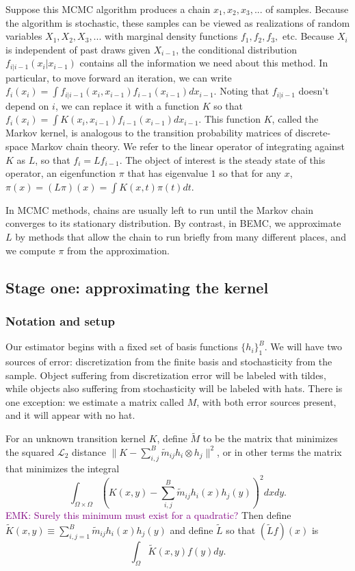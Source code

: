 \documentclass{article}
\newcommand\EMK[1]{\textcolor{purple}{EMK: #1}}
\begin{document}
Suppose this MCMC algorithm produces a chain $ x_1, x_2, x_3, ...$ of samples. Because the algorithm is stochastic, these samples can be viewed as realizations of random variables $X_1, X_2, X_3, ...$ with marginal density functions $f_1, f_2, f_3, $ etc. Because $X_i$ is independent of past draws given $X_{i-1}$, the conditional distribution $f_{i|i-1}(x_i|x_{i-1})$ contains all the information we need about this method. In particular, to move forward an iteration, we can write $f_i(x_i) = \int f_{i|i-1}(x_{i},x_{i-1})f_{i-1}(x_{i-1})dx_{i-1}$. Noting that $f_{i|i-1}$ doesn't depend on $i$, we can replace it with a function $K$ so that $f_i(x_i) = \int K(x_i, x_{i-1})f_{i-1}(x_{i-1})dx_{i-1}$. This function $K$, called the Markov kernel, is analogous to the transition probability matrices of discrete-space Markov chain theory. We refer to the linear operator of integrating against $K$ as $L$, so that $f_{i} = Lf_{i-1}$. The object of interest is the steady state of this operator, an eigenfunction $\pi$ that has eigenvalue $1$ so that for any $x$, $\pi(x) = (L\pi)(x) = \int K(x, t)\pi(t)dt$. 

In MCMC methods, chains are usually left to run until the Markov chain converges to its stationary distribution. By contrast, in BEMC, we approximate $L$ by methods that allow the chain to run briefly from many different places, and we compute $\pi$ from the approximation. 

\subsection{Stage one: approximating the kernel}
\label{sec:BEMC}

\subsubsection{Notation and setup}

Our estimator begins with a fixed set of basis functions $\{h_i\}_1^B$. We will have two sources of error: discretization from the finite basis and stochasticity from the sample. Object suffering from discretization error will be labeled with tildes, while objects also suffering from stochasticity will be labeled with hats. There is one exception: we estimate a matrix called $M$, with both error sources present, and it will appear with no hat.

For an unknown transition kernel $K$, define $\tilde{M}$ to be the matrix that minimizes the squared $\mathcal{L}_2$ distance $\|K - \sum_{i,j}^B\tilde{m}_{ij} h_i \otimes h_j\|^2$, or in other terms the matrix that minimizes the integral $$\int_{\Omega\times\Omega}(K(x,y) - \sum_{i,j}^B\tilde{m}_{ij} h_i(x)h_j(y))^2dx dy .$$ \EMK{Surely this minimum must exist for a quadratic?} Then define $\tilde{K}(x,y) \equiv \sum_{i,j=1}^B \tilde{m}_{ij} h_i(x)h_j(y)$ and define $\tilde{L}$ so that $(\tilde{L}f)(x)$ is $$\int_{\Omega}\tilde{K}(x,y)f(y)dy.$$
\end{document}
